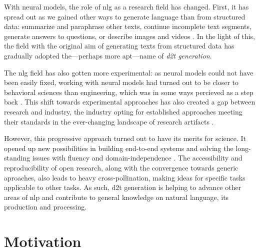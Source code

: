\documentclass[12pt,notitlepage,a4paper,openright]{report}
\begin{document}

With neural models, the role of \ac{nlg} as a research field has changed. First, it has spread out as we gained other ways to generate language than from structured data: summarize and paraphrase other texts, continue incomplete text segments, generate answers to questions, or describe images and videos \cite{Dong2021ASO}. In the light of this, the field with the original aim of generating texts from structured data has gradually adopted the---perhaps more apt---name of \textit{\ac{d2t} generation}.

The \ac{nlg} field has also gotten more experimental: as neural models could not have been easily fixed, working with neural models had turned out to be closer to behavioral sciences than engineering, which was in some ways percieved as a step back \cite{reiter2020academic}. This shift towards experimental approaches has also created a gap between research and industry, the industry opting for established approaches meeting their standards in the ever-changing landscape of research artifacts \cite{daleNaturalLanguageGeneration2020,daleNavigatingTextGeneration2023}.

However, this progressive approach turned out to have its merits for science. It opened up new possibilities in building end-to-end systems and solving the long-standing issues with fluency and domain-independence \cite{ferreiraNeuralDatatotextGeneration2019,dusekEvaluatingStateoftheartEndtoEnd2020,sharmaInnovationsNeuralDatatotext2022}.
The accessibility and reproducibility of open research, along with  the convergence towards generic aproaches, also leads to heavy cross-pollination, making ideas for specific tasks applicable to other tasks. As such, \ac{d2t} generation is helping to advance other areas of \ac{nlp} and contribute to general knowledge on natural language, its production and processing.



\section{Motivation}
\label{sec:rq}
\end{document}
